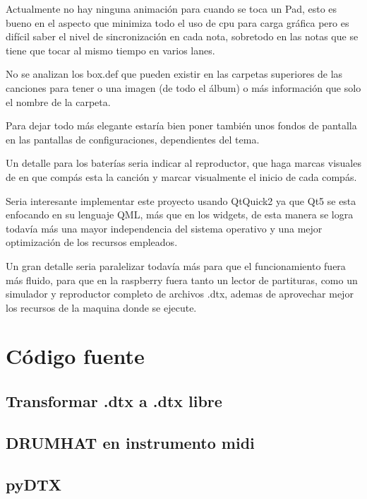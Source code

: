 \documentclass[a4paper,11pt,oneside]{book}
\begin{document}
Actualmente no hay ninguna animación para cuando se toca un Pad, esto es bueno en el aspecto que minimiza todo el uso de cpu para carga gráfica pero es difícil saber el nivel de sincronización en cada nota, sobretodo en las notas que se tiene que tocar al mismo tiempo en varios lanes.

No se analizan los box.def que pueden existir en las carpetas superiores de las canciones para tener o una imagen (de todo el álbum) o más información que solo el nombre de la carpeta.

Para dejar todo más elegante estaría bien poner también unos fondos de pantalla en las pantallas de configuraciones, dependientes del tema.

Un detalle para los baterías seria indicar al reproductor, que haga marcas visuales de en que compás esta la canción y marcar visualmente el inicio de cada compás.

Seria interesante implementar este proyecto usando QtQuick2 ya que Qt5 se esta enfocando en su lenguaje QML, más que en los widgets, de esta manera se logra todavía más una mayor independencia del sistema operativo y una mejor optimización de los recursos empleados.

Un gran detalle seria paralelizar todavía más para que el funcionamiento fuera más fluido, para que en la raspberry fuera tanto un lector de partituras, como un simulador y reproductor completo de archivos .dtx, ademas de aprovechar mejor los recursos de la maquina donde se ejecute.

\appendix


\chapter{Código fuente}
\section{Transformar .dtx a .dtx libre}



\section{DRUMHAT en instrumento midi}


\section{pyDTX}
\end{document}
